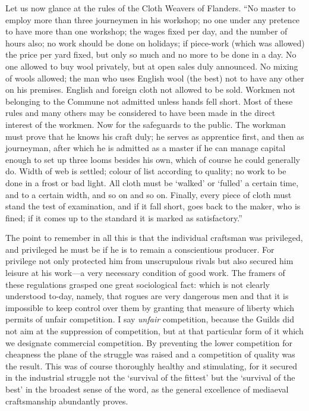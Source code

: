 \documentclass{book}
\begin{document}
Let us now glance at the rules of the Cloth Weavers of Flanders. “No master to employ more than three journeymen in his workshop; no one under any pretence to have more than one workshop; the wages fixed per day, and the number of hours also; no work should be done on holidays; if piece-work (which was allowed) the price per yard fixed, but only so much and no more to be done in a day. No one allowed to buy wool privately, but at open sales duly announced. No mixing of wools allowed; the man who uses English wool (the best) not to have any other on his premises. English and foreign cloth not allowed to be sold. Workmen not belonging to the Commune not admitted unless hands fell short. Most of these rules and many others may be considered to have been made in the direct interest of the workmen. Now for the safeguards to the public. The workman must prove that he knows his craft duly; he serves as apprentice first, and then as journeyman, after which he is admitted as a master if he can manage capital enough to set up three looms besides his own, which of course he could generally do. Width of web is settled; colour of list according to quality; no work to be done in a frost or bad light. All cloth must be ‘walked’ or ‘fulled’ a certain time, and to a certain width, and so on and so on. Finally, every piece of cloth must stand the test of examination, and if it fall short, goes back to the maker, who is fined; if it comes up to the standard it is marked as satisfactory.”

The point to remember in all this is that the individual craftsman was privileged, and privileged he must be if he is to remain a conscientious producer. For privilege not only protected him from unscrupulous rivals but also secured him leisure at his work—a very necessary condition of good work. The framers of these regulations grasped one great sociological fact: which is not clearly understood to-day, namely, that rogues are very dangerous men and that it is impossible to keep control over them by granting that measure of liberty which permits of unfair competition. I say \emph{unfair} competition, because the Guilds did not aim at the suppression of competition, but at that particular form of it which we designate commercial competition. By preventing the lower competition for cheapness the plane of the struggle was raised and a competition of quality was the result. This was of course thoroughly healthy and stimulating, for it secured in the industrial struggle not the ‘survival of the fittest’ but the ‘survival of the best’ in the broadest sense of the word, as the general excellence of mediaeval craftsmanship abundantly proves.
\end{document}
